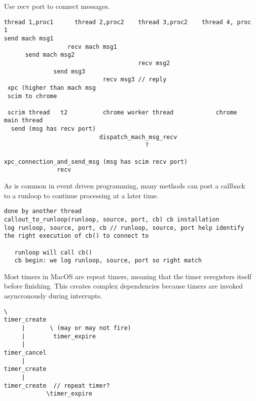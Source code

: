 Use recv port to connect messages.

{\footnotesize \begin{verbatim}
thread 1,proc1      thread 2,proc2    thread 3,proc2    thread 4, proc 1
send mach msg1
                  recv mach msg1
      send mach msg2
                                      recv msg2
              send msg3
                            recv msg3 // reply
 xpc (higher than mach msg
 scim to chrome

 scrim thread   t2          chrome worker thread            chrome main thread
  send (msg has recv port)
                           dispatch_mach_msg_recv
                                        ?

xpc_connection_and_send_msg (msg has scim recv port)
               recv
\end{verbatim}
}

As is common in event driven programming, many methods can post a callback to a runloop to continue processing at a later time.

{\footnotesize \begin{verbatim}
done by another thread
callout_to_runloop(runloop, source, port, cb) cb installation
log runloop, source, port, cb // runloop, source, port help identify
the right execution of cb() to connect to

   runloop will call cb()
   cb begin: we log runloop, source, port so right match
\end{verbatim}
}

Most timers in MacOS are repeat timers, meaning that the timer reregisters itself before finishing.
This creates complex dependencies because timers are invoked asyncronously during interrupts.


{\footnotesize \begin{verbatim}
\
timer_create
     |       \ (may or may not fire)
     |        timer_expire
     |
timer_cancel
     |
timer_create
     |
timer_create  // repeat timer?
            \timer_expire

\end{verbatim}
}
